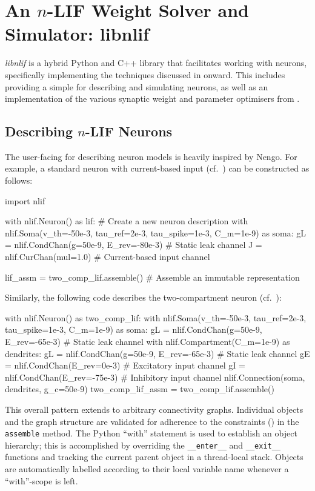 
\section{An $n$-LIF Weight Solver and Simulator: libnlif}
\label{app:libnlif}

\emph{libnlif} is a hybrid Python and C++ library that facilitates working with \nlif neurons, specifically implementing the techniques discussed in  onward.
This includes providing a simple \API for describing and simulating \nlif neurons, as well as an implementation of the various synaptic weight and parameter optimisers from .

\subsection{Describing $n$-LIF Neurons}

The user-facing \API for describing neuron models is heavily inspired by Nengo.
For example, a standard \LIF neuron with current-based input (cf.~) can be constructed as follows:
\begin{pythoncode}
import nlif

with nlif.Neuron() as lif: # Create a new neuron description 
	with nlif.Soma(v_th=-50e-3, tau_ref=2e-3, tau_spike=1e-3, C_m=1e-9) as soma:
		gL = nlif.CondChan(g=50e-9, E_rev=-80e-3) # Static leak channel
		J = nlif.CurChan(mul=1.0)                 # Current-based input channel

lif_assm = two_comp_lif.assemble() # Assemble an immutable representation
\end{pythoncode}
Similarly, the following code describes the two-compartment \LIF neuron (cf.~):
\begin{pythoncode}
with nlif.Neuron() as two_comp_lif:
	with nlif.Soma(v_th=-50e-3, tau_ref=2e-3, tau_spike=1e-3, C_m=1e-9) as soma:
		gL = nlif.CondChan(g=50e-9, E_rev=-65e-3)  # Static leak channel
	with nlif.Compartment(C_m=1e-9) as dendrites:
		gL = nlif.CondChan(g=50e-9, E_rev=-65e-3)  # Static leak channel
		gE = nlif.CondChan(E_rev=0e-3)             # Excitatory input channel
		gI = nlif.CondChan(E_rev=-75e-3)           # Inhibitory input channel
	nlif.Connection(soma, dendrites, g_c=50e-9)
two_comp_lif_assm = two_comp_lif.assemble()
\end{pythoncode}
This overall pattern extends to arbitrary connectivity graphs.
Individual objects and the graph structure are validated for adherence to the \nlif constraints () in the \texttt{assemble} method.
The Python \enquote{with} statement is used to establish an object hierarchy; this is accomplished by overriding the \texttt{\_\_enter\_\_} and \texttt{\_\_exit\_\_} functions and tracking the current parent object in a thread-local stack.
Objects are automatically labelled according to their local variable name whenever a \enquote{with}-scope is left.

